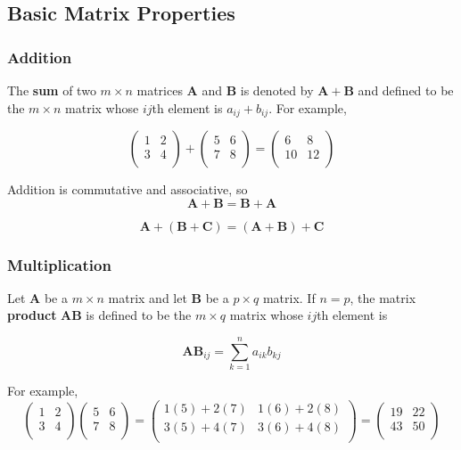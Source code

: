 \documentclass[11pt]{article}
\theoremstyle{definition}
\begin{document}
\subsection{Basic Matrix Properties}
\subsubsection{Addition}
The \textbf{sum} of two $m \times n$ matrices $\mathbf{A}$ and $\mathbf{B}$ is denoted by $\mathbf{A} + \mathbf{B}$ and defined to be the $m \times n$ matrix whose $ij$th element is $a_{ij} + b_{ij}$.  For example,

\[
\begin{pmatrix}
    1 & 2\\
    3 & 4 \\
\end{pmatrix}
+
\begin{pmatrix}
    5 & 6\\
    7 & 8 \\
\end{pmatrix}
= 
\begin{pmatrix}
    6 & 8\\
    10 & 12 \\
\end{pmatrix}
\]

Addition is commutative and associative, so 
\[\mathbf{A} + \mathbf{B} = \mathbf{B} + \mathbf{A}\]

\[\mathbf{A} + (\mathbf{B} + \mathbf{C})= (\mathbf{A} + \mathbf{B}) + \mathbf{C}\]

\subsubsection{Multiplication}
Let $\mathbf{A}$ be a $m \times n$ matrix and let $\mathbf{B}$ be a $p \times q$ matrix.  If $n = p$, the matrix \textbf{product} $\mathbf{AB}$ is defined to be the $m \times q$ matrix whose $ij$th element is

\[\mathbf{AB}_{ij} = \sum_{k=1}^n a_{ik}b_{kj}\]

For example, 
\[
\begin{pmatrix}
    1 & 2\\
    3 & 4 \\
\end{pmatrix}
\begin{pmatrix}
    5 & 6\\
    7 & 8 \\
\end{pmatrix}
= 
\begin{pmatrix}
    1(5) + 2(7) & 1(6) + 2(8)\\
    3(5) + 4(7) & 3(6) + 4(8) \\
\end{pmatrix}
=
\begin{pmatrix}
    19 & 22\\
    43 & 50 \\
\end{pmatrix}
\]
\end{document}
